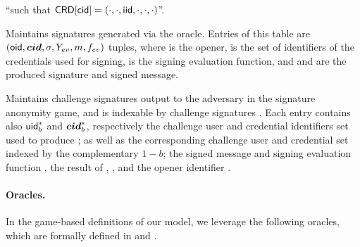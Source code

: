 \begin{description}
  ``\iid such that $\mathsf{CRD}[\mathsf{cid}] = (\cdot,\cdot,\mathsf{iid},\cdot,\cdot,\cdot)$''.
\item[\SIG.] Maintains signatures generated via the \SIGN oracle. Entries of
  this table are $(\mathsf{oid},\boldsymbol{cid},\sigma,Y_{ev},m,f_{ev})$ tuples, where \oid is
  the opener, \scid is the set of identifiers of the credentials used for
  signing, \feval is the signing evaluation function, and \sig and \msg are the
  produced signature and signed message.
\item[\CSIG.] Maintains challenge signatures output to the adversary in the
  signature anonymity game, and is indexable by challenge signatures \csig.
  Each entry contains also $\mathsf{uid}^*_b$ and $\boldsymbol{cid}^*_b$, respectively the challenge
  user  and credential identifiers set used to produce \csig; as well as the
  corresponding challenge user and credential set indexed by the complementary
  $1-b$; the signed message \msg and signing evaluation function \feval, the
  result of \feval, \Yeval, and the opener identifier \oid.
\end{description}

\paragraph{Oracles.} %
In the game-based definitions of our \UAS model, we leverage the following
oracles, which are formally defined in  and
.

